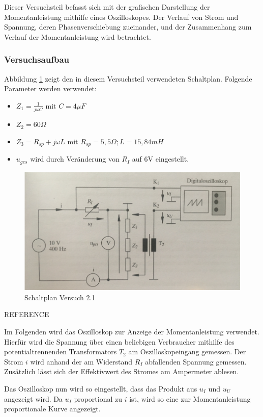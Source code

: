 \label{sec:Versuch2.2.1}
Dieser Versuchsteil befasst sich mit der grafischen Darstellung der Momentanleistung mithilfe eines Oszilloskopes. Der Verlauf von Strom und Spannung, deren Phasenverschiebung zueinander, und der Zusammenhang zum Verlauf der Momentanleistung wird betrachtet.


\subsubsection{Versuchsaufbau}
\label{sec:Aufbau2.2.1}

Abbildung \ref{fig:Plan2-1} zeigt den in diesem Versuchsteil verwendeten Schaltplan. Folgende Parameter werden verwendet:
\begin{itemize}
\item $Z_1 = \frac{1}{j\omega C} \mbox{ mit } C=4\mu F$
\item $Z_2 = 60\Omega$
\item $Z_3 = R_{sp} + j\omega L$ mit $R_{sp} = 5,5\Omega; L=15,84mH$
\item $u_{ges}$ wird durch Veränderung von $R_I$ auf 6V eingestellt.
\end{itemize}

\begin{figure}[h]
\centering
\includegraphics[width=0.7\linewidth]{Images/Aufbau2-1.png}
\caption{Schaltplan Versuch 2.1}
\label{fig:Plan2-1}
\end{figure}
\large{REFERENCE}

Im Folgenden wird das Oszilloskop zur Anzeige der Momentanleistung verwendet. Hierfür wird die Spannung über einen beliebigen Verbraucher mithilfe des potentialtrennenden Transformators $T_2$ am Oszilloskopeingang gemessen. Der Strom $i$ wird anhand der am Widerstand $R_I$ abfallenden Spannung gemessen. Zusätzlich lässt sich der Effektivwert des Stromes am Ampermeter ablesen.

Das Oszilloskop nun wird so eingestellt, dass das Produkt aus $u_I$ und $u_U$ angezeigt wird. Da $u_I$ proportional zu $i$ ist, wird so eine zur Momentanleistung proportionale Kurve angezeigt.

